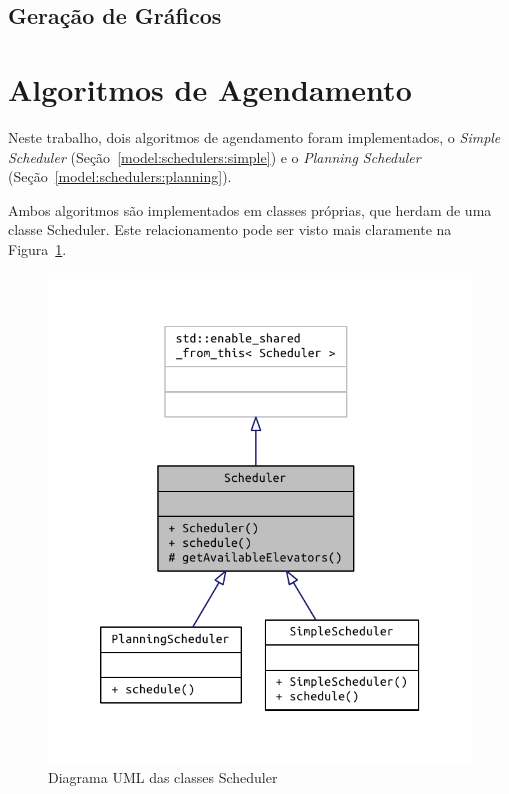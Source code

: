 \subsection{\label{model:report:charts}Geração de Gráficos}
\lipsum[5]

\section{\label{model:schedulers}Algoritmos de Agendamento}
Neste trabalho, dois algoritmos de agendamento foram implementados, o
\textit{Simple Scheduler} (Seção~\ref{model:schedulers:simple}) e o
\textit{Planning Scheduler} (Seção~\ref{model:schedulers:planning}).

Ambos algoritmos são implementados em classes próprias, que herdam de uma classe
\textsf{Scheduler}. Este relacionamento pode ser visto mais claramente na Figura~\ref{fig:model:schedulers:uml:base}.

\begin{figure}[htb]
  \centering
  \includegraphics{doc/latex/class_scheduler__inherit__graph}
  \caption{Diagrama UML das classes Scheduler}
  \label{fig:model:schedulers:uml:base}
\end{figure}

